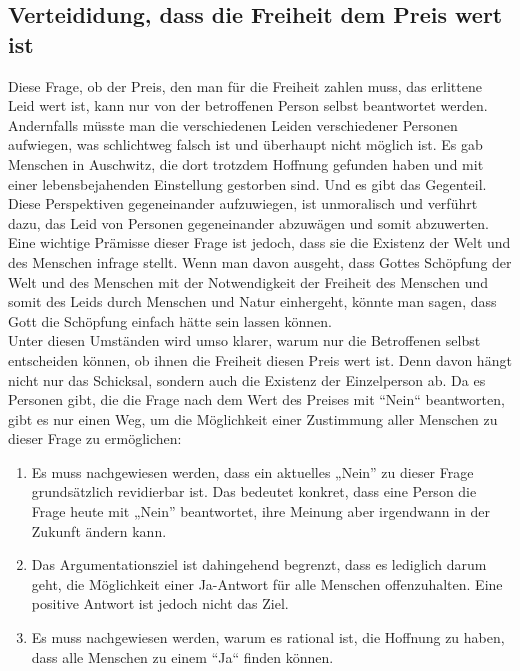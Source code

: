 \subsection{Verteididung, dass die Freiheit dem Preis wert ist} \label{Preis}
Diese Frage, ob der Preis, den man für die Freiheit zahlen muss, das erlittene Leid wert ist, kann nur von der betroffenen Person selbst beantwortet werden. Andernfalls müsste man die verschiedenen Leiden verschiedener Personen aufwiegen, was schlichtweg falsch ist und überhaupt nicht möglich ist. Es gab Menschen in Auschwitz, die dort trotzdem Hoffnung gefunden haben und mit einer lebensbejahenden Einstellung gestorben sind. Und es gibt das Gegenteil. Diese Perspektiven gegeneinander aufzuwiegen, ist unmoralisch und verführt dazu, das Leid von Personen gegeneinander abzuwägen und somit abzuwerten. \\

Eine wichtige Prämisse dieser Frage ist jedoch, dass sie die Existenz der Welt und des Menschen infrage stellt. Wenn man davon ausgeht, dass Gottes Schöpfung der Welt und des Menschen mit der Notwendigkeit der Freiheit des Menschen und somit des Leids durch Menschen und Natur einhergeht, könnte man sagen, dass Gott die Schöpfung einfach hätte sein lassen können. \\

Unter diesen Umständen wird umso klarer, warum nur die Betroffenen selbst entscheiden können, ob ihnen die Freiheit diesen Preis wert ist. Denn davon hängt nicht nur das Schicksal, sondern auch die Existenz der Einzelperson ab. Da es Personen gibt, die die Frage nach dem Wert des Preises mit ``Nein`` beantworten, gibt es nur einen Weg, um die Möglichkeit einer Zustimmung aller Menschen zu dieser Frage zu ermöglichen:
\begin{enumerate}
	\item Es muss nachgewiesen werden, dass ein aktuelles „Nein” zu dieser Frage grundsätzlich revidierbar ist. Das bedeutet konkret, dass eine Person die Frage heute mit „Nein” beantwortet, ihre Meinung aber irgendwann in der Zukunft ändern kann.
	\item Das Argumentationsziel ist dahingehend begrenzt, dass es lediglich darum geht, die Möglichkeit einer Ja-Antwort für alle Menschen offenzuhalten. Eine positive Antwort ist jedoch nicht das Ziel.
	\item Es muss nachgewiesen werden, warum es rational ist, die Hoffnung zu haben, dass alle Menschen zu einem ``Ja`` finden können.
\end{enumerate}

